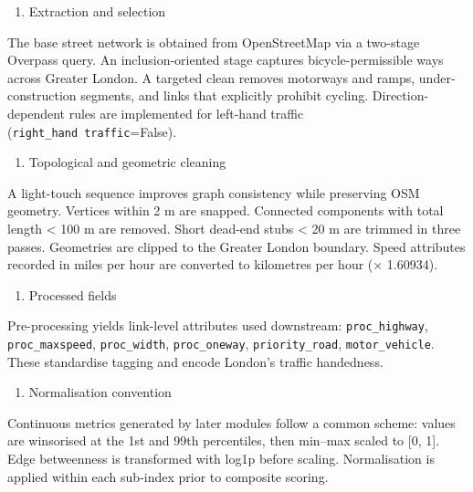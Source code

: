 \documentclass[
  12pt,
  oneside]{book}
\providecommand{\tightlist}{%
  \setlength{\itemsep}{0pt}\setlength{\parskip}{0pt}}
\begin{document}
\begin{enumerate}
\def\labelenumi{\arabic{enumi}.}
\tightlist
\item
  Extraction and selection
\end{enumerate}

The base street network is obtained from OpenStreetMap via a two-stage Overpass query. An inclusion-oriented stage captures bicycle-permissible ways across Greater London. A targeted clean removes motorways and ramps, under-construction segments, and links that explicitly prohibit cycling. Direction-dependent rules are implemented for left-hand traffic (\texttt{right\_hand\ traffic}=False).

\begin{enumerate}
\def\labelenumi{\arabic{enumi}.}
\setcounter{enumi}{1}
\tightlist
\item
  Topological and geometric cleaning
\end{enumerate}

A light-touch sequence improves graph consistency while preserving OSM geometry. Vertices within 2 m are snapped. Connected components with total length \textless{} 100 m are removed. Short dead-end stubs \textless{} 20 m are trimmed in three passes. Geometries are clipped to the Greater London boundary. Speed attributes recorded in miles per hour are converted to kilometres per hour (× 1.60934).

\begin{enumerate}
\def\labelenumi{\arabic{enumi}.}
\setcounter{enumi}{2}
\tightlist
\item
  Processed fields
\end{enumerate}

Pre-processing yields link-level attributes used downstream: \texttt{proc\_highway}, \texttt{proc\_maxspeed}, \texttt{proc\_width}, \texttt{proc\_oneway}, \texttt{priority\_road}, \texttt{motor\_vehicle}. These standardise tagging and encode London's traffic handedness.

\begin{enumerate}
\def\labelenumi{\arabic{enumi}.}
\setcounter{enumi}{3}
\tightlist
\item
  Normalisation convention
\end{enumerate}

Continuous metrics generated by later modules follow a common scheme: values are winsorised at the 1st and 99th percentiles, then min--max scaled to {[}0, 1{]}. Edge betweenness is transformed with log1p before scaling. Normalisation is applied within each sub-index prior to composite scoring.
\end{document}

